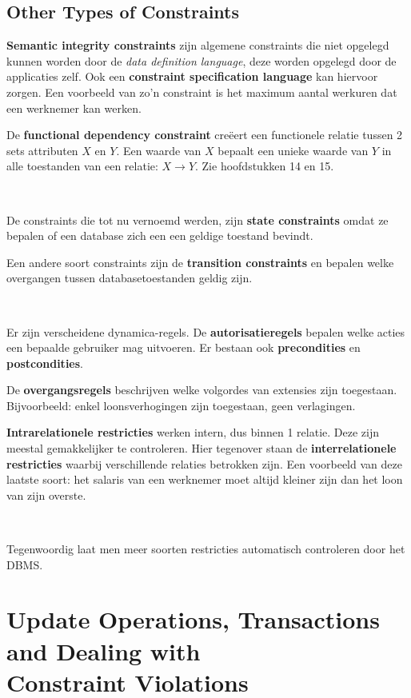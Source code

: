 \subsection{Other Types of Constraints}
\textbf{Semantic integrity constraints} zijn algemene constraints die niet opgelegd kunnen worden door de \textit{data definition language}, deze worden opgelegd door de applicaties zelf. Ook een \textbf{constraint specification language} kan hiervoor zorgen. Een voorbeeld van zo'n constraint is het maximum aantal werkuren dat een werknemer kan werken.

De \textbf{functional dependency constraint} cre\"eert een functionele relatie tussen 2 sets attributen $X$ en $Y$. Een waarde van $X$ bepaalt een unieke waarde van $Y$ in alle toestanden van een relatie: $X \rightarrow Y$. Zie hoofdstukken 14 en 15.

~

\noindent De constraints die tot nu vernoemd werden, zijn \textbf{state constraints} omdat ze bepalen of een database zich een een geldige toestand bevindt.

Een andere soort constraints zijn de \textbf{transition constraints} en bepalen welke overgangen tussen databasetoestanden geldig zijn.

~

\noindent Er zijn verscheidene dynamica-regels. De \textbf{autorisatieregels} bepalen welke acties een bepaalde gebruiker mag uitvoeren. Er bestaan ook \textbf{precondities} en \textbf{postcondities}.

De \textbf{overgangsregels} beschrijven welke volgordes van extensies zijn toegestaan. Bijvoorbeeld: enkel loonsverhogingen zijn toegestaan, geen verlagingen.

\textbf{Intrarelationele restricties} werken intern, dus binnen 1 relatie. Deze zijn meestal gemakkelijker te controleren. Hier tegenover staan de \textbf{interrelationele restricties} waarbij verschillende relaties betrokken zijn. Een voorbeeld van deze laatste soort: het salaris van een werknemer moet altijd kleiner zijn dan het loon van zijn overste.

~

\noindent Tegenwoordig laat men meer soorten restricties automatisch controleren door het DBMS.

\section[Update Operations, Transactions and Dealing with Constraint Violations]{Update Operations, Transactions and Dealing with\\Constraint Violations}

